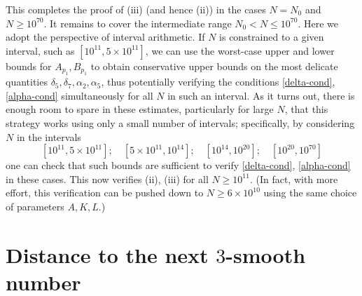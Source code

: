 \documentclass[12pt,a4paper,reqno]{amsart}
\numberwithin{equation}{section}
\theoremstyle{plain}
\theoremstyle{definition}
\begin{document}
This completes the proof of (iii) (and hence (ii)) in the cases $N=N_0$ and $N \geq 10^{70}$.  It remains to cover the intermediate range $N_0 < N \leq 10^{70}$.  Here we adopt the perspective of interval arithmetic.  If $N$ is constrained to a given interval, such as $[10^{11}, 5 \times 10^{11}]$, we can use the worst-case upper and lower bounds for $A_{p_1}, B_{p_1}$ to obtain conservative upper bounds on the most delicate quantities
$\delta_5, \delta_7, \alpha_2, \alpha_5$, thus potentially verifying the conditions \eqref{delta-cond}, \eqref{alpha-cond} simultaneously for all $N$ in such an interval.  As it turns out, there is enough room to spare in these estimates, particularly for large $N$, that this strategy works using only a small number of intervals; specifically, by considering $N$ in the intervals
$$ [10^{11}, 5 \times 10^{11}]; \quad [5 \times 10^{11}, 10^{14}]; \quad [10^{14}, 10^{20}]; \quad [10^{20}, 10^{70}]$$
one can check that such bounds are sufficient to verify \eqref{delta-cond}, \eqref{alpha-cond} in these cases.  This now verifies (ii), (iii) for all $N \geq 10^{11}$.
(In fact, with more effort, this verification can be pushed down to $N \geq 6 \times 10^{10}$ using the same choice of parameters $A,K,L$.)
  
\appendix

\section{Distance to the next \texorpdfstring{$3$}{3}-smooth number}\label{power-sec}
\end{document}
